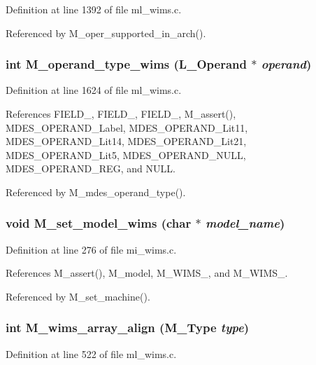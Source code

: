 Definition at line 1392 of file ml\_\-wims.c.

Referenced by M\_\-oper\_\-supported\_\-in\_\-arch().
\subsubsection{\setlength{\rightskip}{0pt plus 5cm}int M\_\-operand\_\-type\_\-wims (L\_\-Operand $\ast$ {\em operand})}\label{m__wims_8h_a988cb6cc1f684e36ef347b82cc8aa3d}




Definition at line 1624 of file ml\_\-wims.c.

References FIELD\_, FIELD\_, FIELD\_, M\_\-assert(), MDES\_\-OPERAND\_\-Label, MDES\_\-OPERAND\_\-Lit11, MDES\_\-OPERAND\_\-Lit14, MDES\_\-OPERAND\_\-Lit21, MDES\_\-OPERAND\_\-Lit5, MDES\_\-OPERAND\_\-NULL, MDES\_\-OPERAND\_\-REG, and NULL.

Referenced by M\_\-mdes\_\-operand\_\-type().
\subsubsection{\setlength{\rightskip}{0pt plus 5cm}void M\_\-set\_\-model\_\-wims (char $\ast$ {\em model\_\-name})}\label{m__wims_8h_f36de6117776e46240e25df545776c32}




Definition at line 276 of file mi\_\-wims.c.

References M\_\-assert(), M\_\-model, M\_\-WIMS\_, and M\_\-WIMS\_.

Referenced by M\_\-set\_\-machine().
\subsubsection{\setlength{\rightskip}{0pt plus 5cm}int M\_\-wims\_\-array\_\-align (\bf{M\_\-Type} {\em type})}\label{m__wims_8h_153212309df8267a4886711a49217400}




Definition at line 522 of file ml\_\-wims.c.

